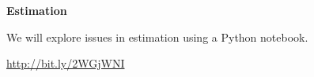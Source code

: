 \begin{frame}\begin{center}
		\LARGE\textbf{Estimation}
\end{center}\end{frame}
\begin{frame}
We will explore issues in estimation using a Python notebook.\vspace{0.3cm}
\begin{center}
\url{http://bit.ly/2WGjWNI}
\end{center}
\end{frame}

